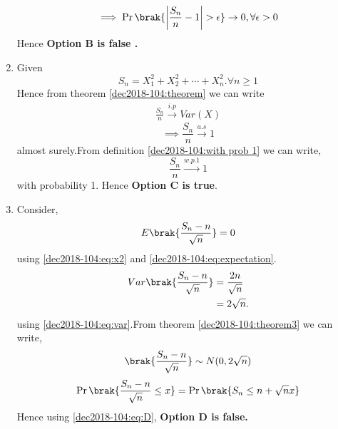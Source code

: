 \begin{enumerate}
\begin{equation}
    \implies \Pr{\brak{\left|\frac{S_n}{n}-1\right|>\epsilon}}\to 0,\forall \epsilon>0
\end{equation}
Hence \textbf{Option B is false .}
\item Given 
\begin{equation}
    S_{n}=X_{1}^2+X_{2}^2+\cdots+X_{n}^2.\forall n\geq 1
\end{equation}
Hence from theorem \ref{dec2018-104:theorem} we can write 
\begin{align}
    \frac{S_n}{n} \xrightarrow{i.p} Var(X)
\end{align}
\begin{equation}
    \implies \frac{S_n}{n} \xrightarrow{a.s} 1
\end{equation}
almost surely.From definition \ref{dec2018-104:with prob 1} we can write,
\begin{equation}
    \frac{S_{n}}{n} \xrightarrow{w.p.1} 1
\end{equation}
with probability 1.
Hence \textbf{Option C is true}.
\item Consider,
\begin{equation}
    E\brak{\frac{S_{n}-n}{\sqrt{n}}}=0
\end{equation}
using \eqref{dec2018-104:eq:x2} and \eqref{dec2018-104:eq:expectation}.
\begin{align}
     Var\brak{\frac{S_{n}-n}{\sqrt{n}}}&=\frac{2n}{\sqrt{n}}\\
     &=2\sqrt{n}.
\end{align}
using \eqref{dec2018-104:eq:var}.From theorem \ref{dec2018-104:theorem3} we can write,
\begin{equation}
    \brak{\frac{S_{n}-n}{\sqrt{n}}} \sim N(0,2 \sqrt{n})\label{dec2018-104:eq:D}
\end{equation}
\begin{equation}
     \Pr{\brak{\frac{S_{n}-n}{\sqrt{n}} \leq x}}= \Pr{\brak{S_{n} \leq n+\sqrt{n}x}}
\end{equation}
Hence using \eqref{dec2018-104:eq:D}, \textbf{Option D is false.}
\end {enumerate}